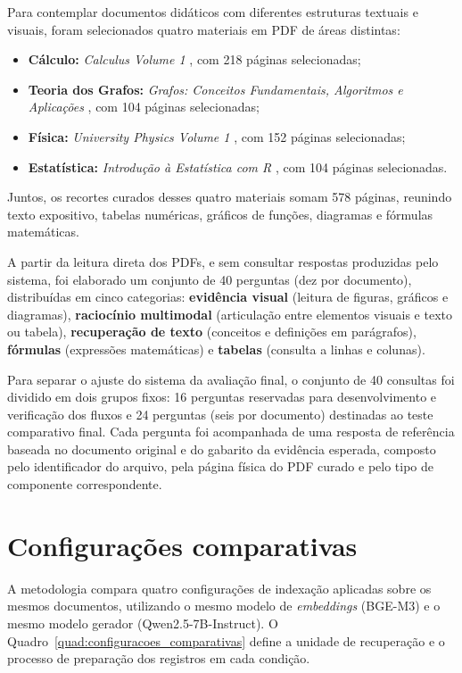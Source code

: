 Para contemplar documentos didáticos com diferentes estruturas textuais e visuais, foram selecionados quatro materiais em PDF de áreas distintas:
\begin{itemize}
    \item[-] \textbf{Cálculo:} \textit{Calculus Volume 1} , com 218 páginas selecionadas;
    \item[-] \textbf{Teoria dos Grafos:} \textit{Grafos: Conceitos Fundamentais, Algoritmos e Aplicações} , com 104 páginas selecionadas;
    \item[-] \textbf{Física:} \textit{University Physics Volume 1} , com 152 páginas selecionadas;
    \item[-] \textbf{Estatística:} \textit{Introdução à Estatística com R} , com 104 páginas selecionadas.
\end{itemize}

Juntos, os recortes curados desses quatro materiais somam 578 páginas, reunindo texto expositivo, tabelas numéricas, gráficos de funções, diagramas e fórmulas matemáticas.

A partir da leitura direta dos PDFs, e sem consultar respostas produzidas pelo sistema, foi elaborado um conjunto de 40 perguntas (dez por documento), distribuídas em cinco categorias: \textbf{evidência visual} (leitura de figuras, gráficos e diagramas), \textbf{raciocínio multimodal} (articulação entre elementos visuais e texto ou tabela), \textbf{recuperação de texto} (conceitos e definições em parágrafos), \textbf{fórmulas} (expressões matemáticas) e \textbf{tabelas} (consulta a linhas e colunas).

Para separar o ajuste do sistema da avaliação final, o conjunto de 40 consultas foi dividido em dois grupos fixos: 16 perguntas reservadas para desenvolvimento e verificação dos fluxos e 24 perguntas (seis por documento) destinadas ao teste comparativo final. Cada pergunta foi acompanhada de uma resposta de referência baseada no documento original e do gabarito da evidência esperada, composto pelo identificador do arquivo, pela página física do PDF curado e pelo tipo de componente correspondente.

\section{Configurações comparativas}
\label{sec:configuracoes_comparativas}

A metodologia compara quatro configurações de indexação aplicadas sobre os mesmos documentos, utilizando o mesmo modelo de \textit{embeddings} (BGE-M3) e o mesmo modelo gerador (Qwen2.5-7B-Instruct). O Quadro~\ref{quad:configuracoes_comparativas} define a unidade de recuperação e o processo de preparação dos registros em cada condição.

